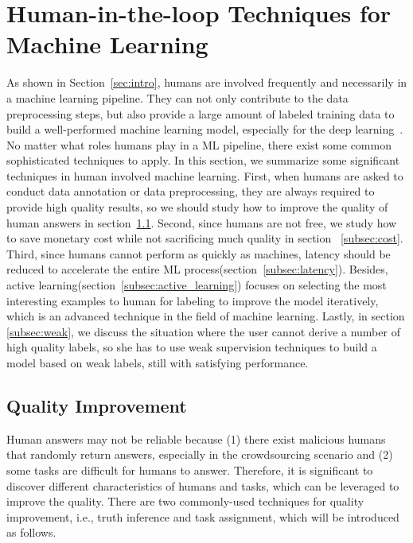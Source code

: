 \section{Human-in-the-loop Techniques for Machine Learning}
\label{sec:overview}

As shown in Section~\ref{sec:intro}, humans are involved frequently and necessarily in a machine learning pipeline.  They can not only contribute to the data preprocessing steps, but also  provide a large amount of labeled training data to build a well-performed machine learning  model, especially for the deep learning~\cite{DBLP:imagenet}. No matter what roles humans play in a ML pipeline, there exist some common sophisticated techniques to apply. In this section, we summarize some significant techniques in human involved machine learning. First, when humans are asked to conduct data annotation or data preprocessing, they are always required to provide high quality results, so we should study how to improve the quality of human answers in section~\ref{subsec:quality}. Second, since humans are not free, we study how to save monetary cost while not sacrificing much quality in section ~\ref{subsec:cost}. Third, since humans cannot perform as quickly as machines, latency should be reduced to accelerate the entire ML process(section~\ref{subsec:latency}).  Besides, active learning(section~\ref{subsec:active_learning}) focuses on selecting the most interesting examples to human for labeling to improve the model iteratively, which is an advanced technique in the field of machine learning. Lastly, in section \ref{subsec:weak}, we discuss the situation where the user cannot derive a number of high quality labels, so she has to use weak supervision techniques to build a model based on  weak labels, still with satisfying performance.

\subsection{Quality Improvement}\label{subsec:quality}

Human answers may not be reliable because (1) there exist malicious humans that randomly return answers, especially in the crowdsourcing scenario and (2) some tasks are difficult for humans to answer. Therefore, it is significant to discover different characteristics of humans and tasks, which can be leveraged to improve the quality.  There are two commonly-used  techniques for quality improvement, i.e., truth inference and task assignment, which will be introduced as follows.


